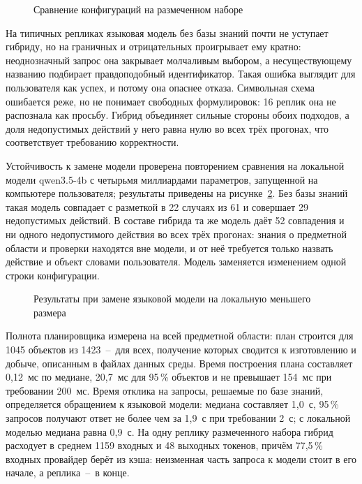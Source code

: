 \begin{figure}[!htb]
  \centering
  
  \caption{Сравнение конфигураций на размеченном наборе}
  \label{fig:comparison}
\end{figure}

На типичных репликах языковая модель без базы знаний почти не уступает гибриду, но на
граничных и отрицательных проигрывает ему кратно: неоднозначный запрос она закрывает
молчаливым выбором, а несуществующему названию подбирает правдоподобный идентификатор.
Такая ошибка выглядит для пользователя как успех, и потому она опаснее отказа\cite{Ji2023}.
Символьная схема ошибается реже, но не понимает свободных формулировок: 16 реплик она
не распознала как просьбу. Гибрид объединяет сильные стороны обоих подходов, а доля
недопустимых действий у него равна нулю во всех трёх прогонах, что соответствует
требованию корректности.

Устойчивость к замене модели проверена повторением сравнения на локальной модели
qwen3.5-4b с четырьмя миллиардами параметров, запущенной на компьютере пользователя;
результаты приведены на рисунке~\ref{fig:robustness}. Без базы знаний такая модель
совпадает с разметкой в 22 случаях из 61 и совершает 29 недопустимых действий. В составе
гибрида та же модель даёт 52 совпадения и ни одного недопустимого действия во всех трёх
прогонах: знания о предметной области и проверки находятся вне модели, и от неё
требуется только назвать действие и объект словами пользователя. Модель заменяется
изменением одной строки конфигурации.

\begin{figure}[!htb]
  \centering
  
  \caption{Результаты при замене языковой модели на локальную меньшего размера}
  \label{fig:robustness}
\end{figure}

{ Полнота планировщика измерена на всей предметной области: план строится для 1045
объектов из 1423~--~для всех, получение которых сводится к изготовлению и добыче,
описанным в файлах данных среды. Время построения плана составляет 0,12~мс по
медиане, 20,7~мс для 95\,\% объектов и не превышает 154~мс при требовании
200~мс. Время отклика на запросы, решаемые по базе знаний, определяется обращением к
языковой модели: медиана составляет 1,0~с, 95\,\% запросов получают ответ не более чем
за 1,9~с при требовании 2~с; с локальной моделью медиана равна 0,9~с. На одну реплику размеченного набора гибрид
расходует в среднем 1159 входных и 48 выходных токенов, причём 77,5\,\% входных
провайдер берёт из кэша: неизменная часть запроса к модели стоит в его начале, а
реплика~--~в конце.\par}

